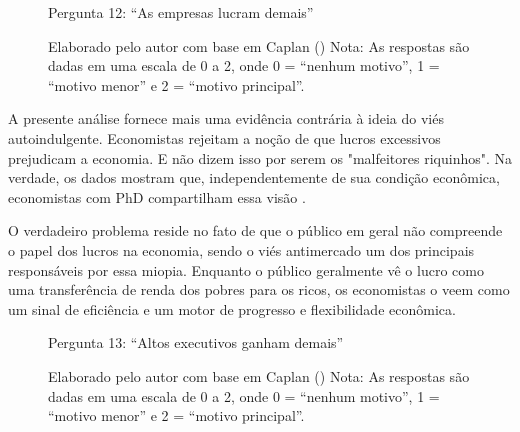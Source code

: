 \begin{figure}[H]
    \centering
    \caption*{Pergunta 12: “As empresas lucram demais”}
    \caption{Elaborado pelo autor com base em Caplan (\citeyear{The_Myth_of_the_Rational_Voter}) \newline
    Nota: As respostas são dadas em uma escala de 0 a 2, onde 0 = “nenhum motivo”, 1 = “motivo menor” e 2 = “motivo principal”.}
    \label{fig:pergunta_12}
\end{figure}

A presente análise fornece mais uma evidência contrária à ideia do viés autoindulgente. Economistas rejeitam a noção de que lucros excessivos prejudicam a economia. E não dizem isso por serem os "malfeitores riquinhos". Na verdade, os dados mostram que, independentemente de sua condição econômica, economistas com PhD compartilham essa visão \cite{The_Myth_of_the_Rational_Voter}.

O verdadeiro problema reside no fato de que o público em geral não compreende o papel dos lucros na economia, sendo o viés antimercado um dos principais responsáveis por essa miopia. Enquanto o público geralmente vê o lucro como uma transferência de renda dos pobres para os ricos, os economistas o veem como um sinal de eficiência e um motor de progresso e flexibilidade econômica.

\begin{figure}[H]
    \centering
    \caption*{Pergunta 13: “Altos executivos ganham demais”}
    \caption{Elaborado pelo autor com base em Caplan (\citeyear{The_Myth_of_the_Rational_Voter}) \newline
    Nota: As respostas são dadas em uma escala de 0 a 2, onde 0 = “nenhum motivo”, 1 = “motivo menor” e 2 = “motivo principal”.}
    \label{fig:pergunta_13}
\end{figure}

